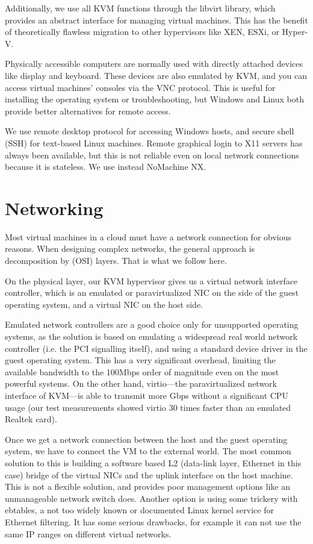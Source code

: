 \documentclass{llncs}
\begin{document}
Additionally, we use all KVM functions through the libvirt library, which provides an abstract interface for managing virtual machines.\cite{victoria2009creating} This has the benefit of theoretically flawless migration to other hypervisors like XEN, ESXi, or Hyper-V.\cite{bolte2010non}

Physically accessible computers are normally used with directly attached devices like display and keyboard. These devices are also emulated by KVM, and you can access virtual machines' consoles via the VNC protocol. This is useful for installing the operating system or troubleshooting, but Windows and Linux both provide better alternatives for remote access.

We use remote desktop protocol for accessing Windows hosts, and secure shell (SSH) for text-based Linux machines. Remote graphical login to X11 servers has always been available, but this is not reliable even on local network connections because it is stateless. We use instead NoMachine NX\cite{pinzari2003introduction}.
   
\section{Networking}
Most virtual machines in a cloud must have a network connection for obvious reasons.  When designing complex networks, the general approach is decomposition by (OSI) layers. That is what we follow here.

On the physical layer, our KVM hypervisor gives us a virtual network interface controller, which is an emulated or paravirtualized NIC on the side of the guest operating system, and a virtual NIC on the host side.

Emulated network controllers are a good choice only for unsupported operating systems, as the solution is based on emulating a widespread real world network controller (i.e. the PCI signalling itself), and using a standard device driver in the guest operating system. This has a very significant overhead, limiting the available bandwidth to the 100Mbps order of magnitude even on the most powerful systems. On the other hand, virtio---the paravirtualized network interface of KVM---is able to transmit more Gbps without a significant CPU usage (our test measurements showed virtio 30 times faster than an emulated Realtek card).

Once we get a network connection between the host and the guest operating system, we have to connect the VM to the external world. The most common solution to this is building a software based L2 (data-link layer, Ethernet in this case) bridge of the virtual NICs and the uplink interface on the host machine. This is not a flexible solution, and provides poor management options like an unmanageable network switch does. Another option is using some trickery with ebtables, a not too widely known or documented Linux kernel service for Ethernet filtering. It has some serious drawbacks, for example it can not use the same IP ranges on different virtual networks.
\end{document}
